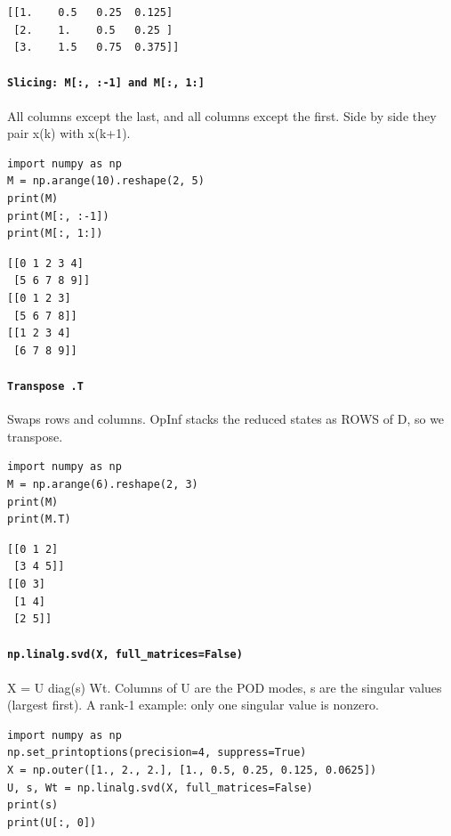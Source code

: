 \begin{lstlisting}[style=out]
[[1.    0.5   0.25  0.125]
 [2.    1.    0.5   0.25 ]
 [3.    1.5   0.75  0.375]]
\end{lstlisting}

\paragraph{\texttt{Slicing: M[:, :-1] and M[:, 1:]}} All columns except the last, and all columns except the first. Side by side they pair x(k) with x(k+1).

\begin{lstlisting}[style=py]
import numpy as np
M = np.arange(10).reshape(2, 5)
print(M)
print(M[:, :-1])
print(M[:, 1:])
\end{lstlisting}

\begin{lstlisting}[style=out]
[[0 1 2 3 4]
 [5 6 7 8 9]]
[[0 1 2 3]
 [5 6 7 8]]
[[1 2 3 4]
 [6 7 8 9]]
\end{lstlisting}

\paragraph{\texttt{Transpose .T}} Swaps rows and columns. OpInf stacks the reduced states as ROWS of D, so we transpose.

\begin{lstlisting}[style=py]
import numpy as np
M = np.arange(6).reshape(2, 3)
print(M)
print(M.T)
\end{lstlisting}

\begin{lstlisting}[style=out]
[[0 1 2]
 [3 4 5]]
[[0 3]
 [1 4]
 [2 5]]
\end{lstlisting}

\paragraph{\texttt{np.linalg.svd(X, full\_matrices=False)}} X = U diag(s) Wt. Columns of U are the POD modes, s are the singular values (largest first). A rank-1 example: only one singular value is nonzero.

\begin{lstlisting}[style=py]
import numpy as np
np.set_printoptions(precision=4, suppress=True)
X = np.outer([1., 2., 2.], [1., 0.5, 0.25, 0.125, 0.0625])
U, s, Wt = np.linalg.svd(X, full_matrices=False)
print(s)
print(U[:, 0])
\end{lstlisting}

